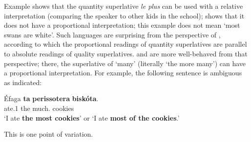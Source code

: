 \documentclass[output=paper
,modfonts
,nonflat]{langsci/langscibook}
\begin{document}
Example  shows that the quantity superlative \textit{le plus} can be used with a relative interpretation (comparing the speaker to other kids in the school);  shows that it does not have a proportional interpretation; this example does not mean `most swans are white'. Such languages are surprising from the perspective of \citet{Hackl2000,Hackl2009}, according to which the proportional readings of quantity superlatives are parallel to absolute readings of quality superlatives.  and  are more well-behaved from that perspective; there, the superlative of `many' (literally `the more many') can have a proportional interpretation. For example, the following  sentence is ambiguous as indicated:

\ea \label{ex:coppockstrand:5}
\gll Éfaga \textbf{ta} \textbf{perissotera} \textbf{biskóta}.\\
ate.1\sg{} the much.\cmpr{} cookies\\ 
\glt `I ate \textbf{the most cookies}' or `I ate \textbf{most of the cookies}.'
\z

This is one point of variation.
\end{document}
